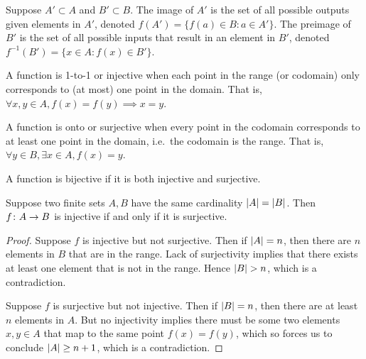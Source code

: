 \begin{definition}
    Suppose \(A' \subset A\) and \(B' \subset B\).
    The image of \(A'\) is the set of all possible outputs
    given elements in \(A'\),
    denoted \(f(A') = \{f(a) \in B : a \in A'\}\).
    The preimage of \(B'\) is the set of all possible inputs
    that result in an element in \(B'\),
    denoted \(f^{-1}(B') = \{x \in A : f(x) \in B'\}\).
\end{definition}

\begin{definition}
    A function is 1-to-1 or injective
    when each point in the range (or codomain)
    only corresponds to (at most) one point in the domain.
    That is, \(\forall x,y \in A, f(x) = f(y) \implies x = y\).
\end{definition}
\begin{definition}
    A function is onto or surjective
    when every point in the codomain
    corresponds to at least one point in the domain,
    i.e.\ the codomain is the range.
    That is, \(\forall y \in B, \exists x \in A, f(x) = y\).
\end{definition}
\begin{definition}
    A function is bijective if it is both injective and surjective.
\end{definition}


\begin{theorem}
    Suppose two finite sets \(A,B\) have the same cardinality
    \(\abs{A} = \abs{B}\).
    Then \(f\colon A\to B\) is injective
    if and only if it is surjective.
\end{theorem}
\begin{proof}
    Suppose \(f\) is injective but not surjective.
    Then if \(\abs{A} = n\),
    then there are \(n\) elements in \(B\) that are in the range.
    Lack of surjectivity implies that
    there exists at least one element that is not in the range.
    Hence \(\abs{B} > n\), which is a contradiction.

    Suppose \(f\) is surjective but not injective.
    Then if \(\abs{B} = n\),
    then there are at least \(n\) elements in \(A\).
    But no injectivity implies there must be some two elements
    \(x,y \in A\) that map to the same point \(f(x) = f(y)\),
    which so forces us to conclude \(\abs{A} \geq n+1\),
    which is a contradiction.
\end{proof}

